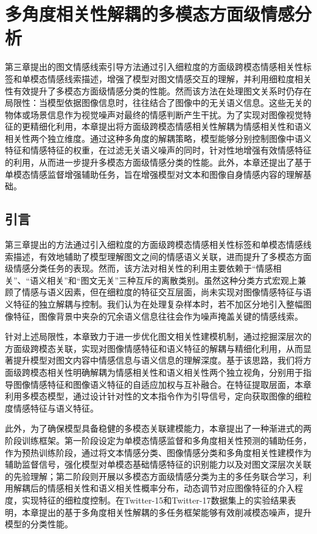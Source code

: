 \chapter{多角度相关性解耦的多模态方面级情感分析}
第三章提出的图文情感线索引导方法通过引入细粒度的方面级跨模态情感相关性标签和单模态情感线索描述，增强了模型对图文情感交互的理解，并利用细粒度相关性有效提升了多模态方面级情感分类的性能。然而该方法在处理图文关系时仍存在局限性：当模型依据图像信息时，往往结合了图像中的无关语义信息。这些无关的物体或场景信息作为视觉噪声对最终的情感判断产生干扰。为了实现对图像视觉特征的更精细化利用，本章提出将方面级跨模态情感相关性解耦为情感相关性和语义相关性两个独立维度。通过这种多角度的解耦策略，模型能够分别控制图像中语义特征和情感特征的权重，在过滤无关语义噪声的同时，针对性地增强有效情感特征的利用，从而进一步提升多模态方面级情感分类的性能。此外，本章还提出了基于单模态情感监督增强辅助任务，旨在增强模型对文本和图像自身情感内容的理解基础。


\section{引言}
第三章提出的方法通过引入细粒度的方面级跨模态情感相关性标签和单模态情感线索描述，有效地辅助了模型理解图文之间的情感语义关联，进而提升了多模态方面级情感分类任务的表现。然而，该方法对相关性的利用主要依赖于“情感相关”、“语义相关”和“图文无关”三种互斥的离散类别。虽然这种分类方式宏观上兼顾了情感与语义因素，但在细粒度的特征交互层面，尚未实现对图像情感特征与语义特征的独立解耦与控制。我们认为在处理复杂样本时，若不加区分地引入整幅图像特征，图像背景中夹杂的冗余语义信息往往会作为噪声掩盖关键的情感线索。

针对上述局限性，本章致力于进一步优化图文相关性建模机制，通过挖掘深层次的方面级跨模态关联，实现对图像情感特征和语义特征的解耦与精细化利用，从而显著提升模型对图文内容中情感信息与语义信息的理解深度。基于该思路，我们将方面级跨模态相关性明确解耦为情感相关性和语义相关性两个独立视角，分别用于指导图像情感特征和图像语义特征的自适应加权与互补融合。在特征提取层面，本章利用多模态模型，通过设计针对性的文本指令作为引导信号，定向获取图像的细粒度情感特征与语义特征。

此外，为了确保模型具备稳健的多模态关联建模能力，本章提出了一种渐进式的两阶段训练框架。第一阶段设定为单模态情感监督和多角度相关性预测的辅助任务，作为预热训练阶段，通过将文本情感分类、图像情感分类和多角度相关性建模作为辅助监督信号，强化模型对单模态基础情感特征的识别能力以及对图文深层次关联的先验理解；第二阶段则开展以多模态方面级情感分类为主的多任务联合学习，利用解耦后的情感相关性和语义相关性概率分布，动态调节对应图像特征的介入程度，实现特征的细粒度控制。在Twitter-15和Twitter-17数据集上的实验结果表明，本章提出的基于多角度相关性解耦的多任务框架能够有效削减模态噪声，提升模型的分类性能。


